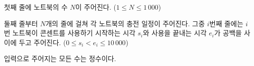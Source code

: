 첫째 줄에 노트북의 수 $N$이 주어진다. ($1 \le N \le 1\,000$)

둘째 줄부터 $N$개의 줄에 걸쳐 각 노트북의 충전 일정이 주어진다. 
그중 $i$번째 줄에는 $i$번 노트북이 콘센트를 사용하기 시작하는 시각 $s_i$와 사용을 끝내는 시각 $e_i$가 공백을 사이에 두고 주어진다. ($0 \le s_i < e_i \le 10\,000$)

입력으로 주어지는 모든 수는 정수이다.